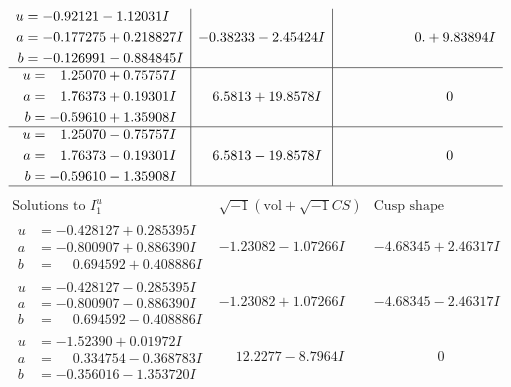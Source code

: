\documentclass[1p]{elsarticle_modified}
\theoremstyle{definition}
\newcommand{\I}{\sqrt{-1}}
\begin{document}
$$\begin{array}{c|c|c}
\begin{aligned}
u &= -0.92121 - 1.12031 I \\
a &= -0.177275 + 0.218827 I \\
b &= -0.126991 - 0.884845 I\end{aligned}
 & -0.38233 - 2.45424 I & \phantom{-0.000000 -}0. + 9.83894 I \\ \hline\begin{aligned}
u &= \phantom{-}1.25070 + 0.75757 I \\
a &= \phantom{-}1.76373 + 0.19301 I \\
b &= -0.59610 + 1.35908 I\end{aligned}
 & \phantom{-}6.5813 + 19.8578 I & \phantom{-0.000000 } 0 \\ \hline\begin{aligned}
u &= \phantom{-}1.25070 - 0.75757 I \\
a &= \phantom{-}1.76373 - 0.19301 I \\
b &= -0.59610 - 1.35908 I\end{aligned}
 & \phantom{-}6.5813 - 19.8578 I & \phantom{-0.000000 } 0\\
 \hline 
 \end{array}$$\newpage$$\begin{array}{c|c|c}  
\text{Solutions to }I^u_{1}& \I (\text{vol} + \sqrt{-1}CS) & \text{Cusp shape}\\
 \hline 
\begin{aligned}
u &= -0.428127 + 0.285395 I \\
a &= -0.800907 + 0.886390 I \\
b &= \phantom{-}0.694592 + 0.408886 I\end{aligned}
 & -1.23082 - 1.07266 I & -4.68345 + 2.46317 I \\ \hline\begin{aligned}
u &= -0.428127 - 0.285395 I \\
a &= -0.800907 - 0.886390 I \\
b &= \phantom{-}0.694592 - 0.408886 I\end{aligned}
 & -1.23082 + 1.07266 I & -4.68345 - 2.46317 I \\ \hline\begin{aligned}
u &= -1.52390 + 0.01972 I \\
a &= \phantom{-}0.334754 - 0.368783 I \\
b &= -0.356016 - 1.353720 I\end{aligned}
 & \phantom{-}12.2277 - 8.7964 I & \phantom{-0.000000 } 0 \\ \hline\begin{aligned}

\end{aligned}
\end{array}$$
\end{document}
